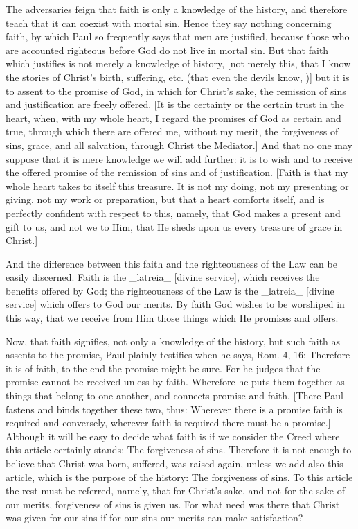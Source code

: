 The adversaries feign that faith is only a knowledge of the history,
and therefore teach that it can coexist with mortal sin.  Hence they
say nothing concerning faith, by which Paul so frequently says that
men are justified, because those who are accounted righteous before
God do not live in mortal sin.  But that faith which justifies is not
merely a knowledge of history, [not merely this, that I know the
stories of Christ's birth, suffering, etc. (that even the devils know,
)] but it is to assent to the promise of God, in which for Christ's
sake, the remission of sins and justification are freely offered.
[It is the certainty or the certain trust in the heart, when, with my
whole heart, I regard the promises of God as certain and true,
through which there are offered me, without my merit, the forgiveness
of sins, grace, and all salvation, through Christ the Mediator.] And
that no one may suppose that it is mere knowledge we will add further:
it is to wish and to receive the offered promise of the remission of
sins and of justification.  [Faith is that my whole heart takes to
itself this treasure.  It is not my doing, not my presenting or
giving, not my work or preparation, but that a heart comforts itself,
and is perfectly confident with respect to this, namely, that God
makes a present and gift to us, and not we to Him, that He sheds upon
us every treasure of grace in Christ.]

And the difference between this faith and the righteousness of the
Law can be easily discerned.  Faith is the _latreia_ [divine service],
which receives the benefits offered by God; the righteousness of the
Law is the _latreia_ [divine service] which offers to God our merits.
By faith God wishes to be worshiped in this way, that we receive
from Him those things which He promises and offers.

Now, that faith signifies, not only a knowledge of the history, but
such faith as assents to the promise, Paul plainly testifies when he
says, Rom. 4, 16: Therefore it is of faith, to the end the promise
might be sure.  For he judges that the promise cannot be received
unless by faith.  Wherefore he puts them together as things that
belong to one another, and connects promise and faith.  [There Paul
fastens and binds together these two, thus: Wherever there is a
promise faith is required and conversely, wherever faith is required
there must be a promise.] Although it will be easy to decide what
faith is if we consider the Creed where this article certainly stands:
The forgiveness of sins.  Therefore it is not enough to believe that
Christ was born, suffered, was raised again, unless we add also this
article, which is the purpose of the history: The forgiveness of sins.
To this article the rest must be referred, namely, that for
Christ's sake, and not for the sake of our merits, forgiveness of
sins is given us.  For what need was there that Christ was given for
our sins if for our sins our merits can make satisfaction?

